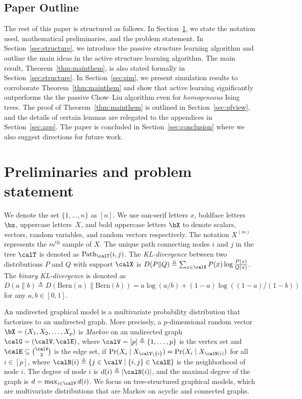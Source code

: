 \documentclass[11pt,onecolumn]{article}
\begin{document}
\subsection{Paper Outline}
The rest of this paper is structured as follows. In Section~\ref{sec:prelim}, we state the notation used, mathematical preliminaries, and the problem statement. In Section~\ref{sec:structure}, we introduce the passive structure learning algorithm  and outline the main ideas in the active structure learning algorithm. The main result, Theorem~\ref{thm:mainthem},  is also stated formally in Section~\ref{sec:structure}.  In Section~\ref{sec:sim}, we present simulation results to corroborate Theorem~\ref{thm:mainthem} and show that active learning significantly outperforms the the passive Chow--Liu algorithm even for {\em homogeneous} Ising trees. The proof of Theorem~\ref{thm:mainthem} is outlined in Section~\ref{sec:pfview}, and the details of certain lemmas are relegated to the appendices in Section~\ref{sec:app}. The paper is concluded in Section~\ref{sec:conclusion} where we also suggest directions for future work. 

\section{Preliminaries and problem statement}\label{sec:prelim}
We denote the set $\{1,\ldots,n\}$ as $[n]$. We use san-serif letters $x$, boldface letters $\bx$, uppercase letters~$X$, and bold uppercase letters $\bX$ %
to denote scalars, vectors, random 
variables,  and random vectors respectively. 
The notation $X^{(m)}$ represents the $m^{\mathrm{th}}$ sample of $X$. The unique path connecting nodes $i$ and $j$ in the tree $\calT$ is denoted as ${\rm Path}_{\calT}(i,j)$. The {\em KL-divergence}   between two distributions $P$ and $Q$ with support $\calX$ is 
$D(P\|Q)\triangleq\sum_{x\in\calX}P(x)\log\frac{P(x)}{Q(x)}$. 
The {\em binary KL-divergence}  is denoted as  $D(a\|b)\triangleq D(\mathrm{Bern}(a) \| \mathrm{Bern}(b)) = a\log (a/b)+(1-a)\log( (1-a)/(1-b))$ for any $a,b\in [0,1]$. %

An undirected graphical model is a multivariate probability distribution that factorizes to an undirected graph\cite{lauritzen1996graphical}. More precisely, a $p$-dimensional random vector $\bX=(X_{1},X_{2},\ldots,X_{p})$ is \emph{Markov} on an undirected graph $\calG=(\calV,\calE)$, where $\calV=[p]\triangleq\{1,\ldots,p\}$ is the vertex set and $\calE\subseteq\tbinom{\calV}{2}$ is the edge set, if $\Pr(X_{i} \mid X_{\calV\backslash \{i\}})=\Pr(X_{i} \mid X_{\calN(i)})$ for all $i\in[p]$, where $\calN(i)\triangleq\{j\in\calV \mid \{i,j\}\in\calE\}$ is the neighborhood of node $i$. The degree of  node $i$ is $d (i)\triangleq |\calN(i)|$, and the maximal degree of the graph is $d=\max_{i\in\calV} d (i)$. We focus on   tree-structured graphical models, which are   multivariate distributions that are Markov on  acyclic and connected  graphs.
\end{document}
